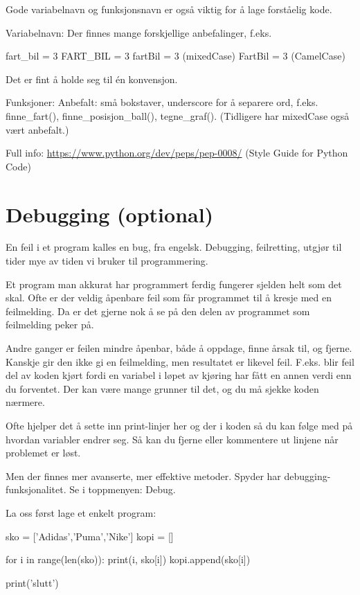 Gode variabelnavn og funksjonsnavn er også viktig for å lage forståelig kode.

Variabelnavn: 
Der finnes mange forskjellige anbefalinger, f.eks.
\begin{usncodebox}
fart_bil = 3
FART_BIL = 3
fartBil = 3 (mixedCase)
FartBil = 3 (CamelCase)
\end{usncodebox}

Det er fint å holde seg til én konvensjon. 

Funksjoner:
Anbefalt: små bokstaver, underscore for å separere ord, f.eks. finne\_{}fart(), finne\_{}posisjon\_{}ball(), tegne\_{}graf(). (Tidligere har mixedCase også vært anbefalt.) 

Full info: \url{https://www.python.org/dev/peps/pep-0008/} (Style Guide for Python Code) 

\section{Debugging (optional)}

En feil i et program kalles en bug, fra engelsk. Debugging, feilretting, utgjør til tider mye av tiden vi bruker til programmering. 

Et program man akkurat har programmert ferdig fungerer sjelden helt som det skal. Ofte er der veldig åpenbare feil som får programmet til å kresje med en feilmelding. Da er det gjerne nok å se på den delen av programmet som feilmelding peker på. 

Andre ganger er feilen mindre åpenbar, både å oppdage, finne årsak til, og fjerne. Kanskje gir den ikke gi en feilmelding, men resultatet er likevel feil. F.eks. blir feil del av koden kjørt fordi en variabel i løpet av kjøring har fått en annen verdi enn du forventet. Der kan være mange grunner til det, og du må sjekke koden nærmere. 

Ofte hjelper det å sette inn print-linjer her og der i koden så du kan følge med på hvordan variabler endrer seg. Så kan du fjerne eller kommentere ut linjene når problemet er løst.

Men der finnes mer avanserte, mer effektive metoder. Spyder har debugging-funksjonalitet.
Se i toppmenyen: Debug.

La oss først lage et enkelt program:

\begin{usncodebox}
sko = ['Adidas','Puma','Nike']
kopi = []

for i in range(len(sko)): 
    print(i, sko[i])
    kopi.append(sko[i])

print('slutt')
\end{usncodebox}

